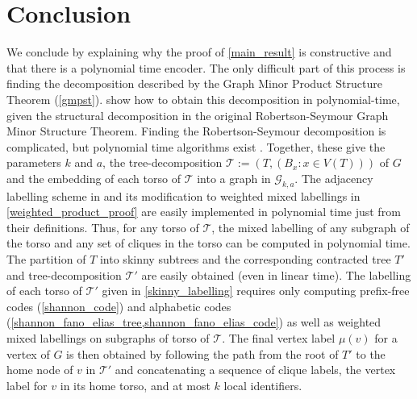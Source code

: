 \documentclass{patmorin}
\newcommand{\vida}[1]{{\color{pink} VD: #1}}
\begin{document}
\section{Conclusion}\label{conclusion}
We conclude by explaining why the proof of \cref{main_result} is constructive and that there is a polynomial time encoder.  The only difficult part of this process is finding the decomposition described by the Graph Minor Product Structure Theorem (\cref{gmpst}).  \citet{dujmovic.joret.ea:planar} show how to obtain this decomposition in polynomial-time, given the structural decomposition in the original Robertson-Seymour Graph Minor Structure Theorem. Finding the Robertson-Seymour decomposition is complicated, but polynomial time algorithms exist \cite{kawarabayashi2018flat,kawarabayashi2020new,gorsky2025polynomial,demaine2005algorithmic}.  Together, these give the parameters $k$ and $a$, the tree-decomposition $\mathcal{T}:=(T, (B_x:x\in V(T)))$ of $G$ and the embedding of each torso of $\mathcal{T}$ into a graph in $\mathcal{G}_{k,a}$. The adjacency labelling scheme in \cite{dujmovic.esperet.ea:adjacency} and its modification to weighted mixed labellings in \cref{weighted_product_proof} are easily implemented in polynomial time just from their definitions.  Thus, for any torso of $\mathcal{T}$, the mixed labelling of any subgraph of the torso and any set of cliques in the torso can be computed in polynomial time.  The partition of $T$ into skinny subtrees and the corresponding contracted tree $T'$ and tree-decomposition $\mathcal{T}'$ are easily obtained (even in linear time).  The labelling of each torso of $\mathcal{T}'$ given in \cref{skinny_labelling} requires only computing prefix-free codes (\cref{shannon_code}) and alphabetic codes (\cref{shannon_fano_elias_tree,shannon_fano_elias_code}) as well as weighted mixed labellings on subgraphs of torso of $\mathcal{T}$.  The final vertex label $\mu(v)$ for a vertex of $G$ is then obtained by following the path from the root of $T'$ to the home node of $v$ in $\mathcal{T}'$ and concatenating a sequence of clique labels, the vertex label for $v$ in its home torso, and at most $k$ local identifiers.



\end{document}
